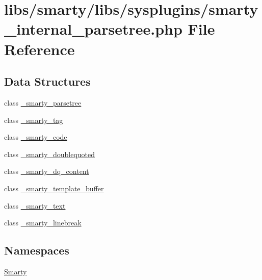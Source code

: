 \hypertarget{smarty__internal__parsetree_8php}{}\section{libs/smarty/libs/sysplugins/smarty\+\_\+internal\+\_\+parsetree.php File Reference}
\label{smarty__internal__parsetree_8php}
\subsection*{Data Structures}
\begin{DoxyCompactItemize}
\item 
class \hyperlink{class__smarty__parsetree}{\+\_\+smarty\+\_\+parsetree}
\item 
class \hyperlink{class__smarty__tag}{\+\_\+smarty\+\_\+tag}
\item 
class \hyperlink{class__smarty__code}{\+\_\+smarty\+\_\+code}
\item 
class \hyperlink{class__smarty__doublequoted}{\+\_\+smarty\+\_\+doublequoted}
\item 
class \hyperlink{class__smarty__dq__content}{\+\_\+smarty\+\_\+dq\+\_\+content}
\item 
class \hyperlink{class__smarty__template__buffer}{\+\_\+smarty\+\_\+template\+\_\+buffer}
\item 
class \hyperlink{class__smarty__text}{\+\_\+smarty\+\_\+text}
\item 
class \hyperlink{class__smarty__linebreak}{\+\_\+smarty\+\_\+linebreak}
\end{DoxyCompactItemize}
\subsection*{Namespaces}
\begin{DoxyCompactItemize}
\item 
 \hyperlink{namespace_smarty}{Smarty}
\end{DoxyCompactItemize}
